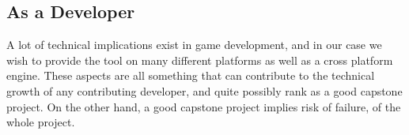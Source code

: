 \subsection{As a Developer}

A lot of technical implications exist in game development, and in our case we
wish to provide the tool on many different platforms as well as a cross platform
engine. These aspects are all something that can contribute to the technical
growth of any contributing developer, and quite possibly rank as a good capstone
project. On the other hand, a good capstone project implies risk of failure, of
the whole project.


